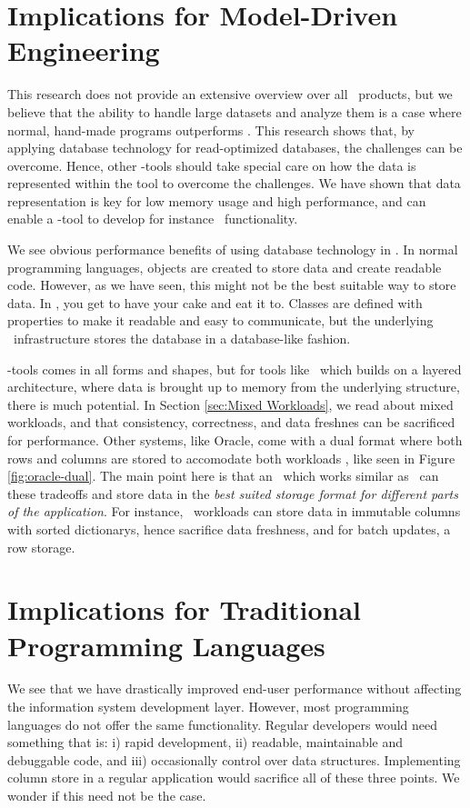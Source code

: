\section{Implications for Model-Driven Engineering}
\label{sec:Implications for Model-Driven Engineering}
This research does not provide an extensive overview over all \mde~products, but we believe that the ability to handle large datasets and analyze them is a case where normal, hand-made programs outperforms \mde. This research shows that, by applying database technology for read-optimized databases, the challenges can be overcome. Hence, other \mdd-tools should take special care on how the data is represented within the tool to overcome the challenges. We have shown that data representation is key for low memory usage and high performance, and can enable a \mde-tool to develop for instance \bd~functionality.

We see obvious performance benefits of using database technology in \mde. In normal programming languages, objects are created to store data and create readable code. However, as we have seen, this might not be the best suitable way to store data. In \mde, you get to have your cake and eat it to. Classes are defined with properties to make it readable and easy to communicate, but the underlying \mde~infrastructure stores the database in a database-like fashion.

\mde-tools comes in all forms and shapes, but for tools like \gap~which builds on a layered architecture, where data is brought up to memory from the underlying structure, there is much potential. In Section \ref{sec:Mixed Workloads}, we read about mixed workloads, and that consistency, correctness, and data freshnes can be sacrificed for performance. Other systems, like Oracle, come with a dual format where both rows and columns are stored to accomodate both workloads \cite{Oracle2015-fs}, like seen in Figure \ref{fig:oracle-dual}. The main point here is that an \mdd~which works similar as \gap~can these tradeoffs and store data in the \textit{best suited storage format for different parts of the application}. For instance, \bd~workloads can store data in immutable columns with sorted dictionarys, hence sacrifice data freshness, and for batch updates, a row storage.



\section{Implications for Traditional Programming Languages}
\label{sec:Implications for Traditional Programming Languages}
We see that we have drastically improved end-user performance without affecting the information system development layer. However, most programming languages do not offer the same functionality. Regular developers would need something that is: i) rapid development, ii) readable, maintainable and debuggable code, and iii) occasionally control over data structures. Implementing column store in a regular application would sacrifice all of these three points. We wonder if this need not be the case.

